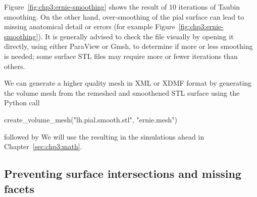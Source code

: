 Figure~\ref{fig:chp3:ernie-smoothing} shows the result of 10
iterations of Taubin smoothing. On the other hand, over-smoothing of
the pial surface can lead to missing anatomical detail or errors
(for example Figure~\ref{fig:chp3:ernie-smoothing}). It is generally advised
to check the file visually by opening it directly, using either
ParaView or Gmsh, to determine if more or less smoothing is needed;
some surface STL files may require more or fewer iterations than
others.

We can generate a higher quality mesh in XML or XDMF format by
generating the volume mesh from the remeshed and smoothened STL
surface using the Python call
\begin{python}
create_volume_mesh("lh.pial.smooth.stl", "ernie.mesh")
\end{python}
followed by
\noindent We will use the resulting  in the
simulations ahead in Chapter~\ref{sec:chp3:math}.

\subsection{Preventing surface intersections and missing facets}
\label{subsec:chp3:preventing-surface-intersections}

